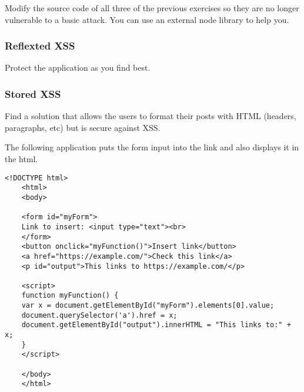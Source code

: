 \begin{Exercise}[label={websec-xss-prevention}]
	Modify the source code of all three of the previous exercises so they are no longer vulnerable to a basic attack. You can use an external node library to help you.
	\subsubsection{Reflexted XSS}
	Protect the application as you find best.
	\subsubsection{Stored XSS}
	Find a solution that allows the users to format their posts with HTML (headers, paragraphs, etc) but is secure against XSS.
\end{Exercise}
\begin{Exercise}[label={websec-xss-breakingcontext}]
	The following application puts the form input into the link and also displays it in the html.
	\begin{lstlisting}[style=JavaScript]
	<!DOCTYPE html>
	<html>
	<body>

	<form id="myForm">
	Link to insert: <input type="text"><br>
	</form> 
	<button onclick="myFunction()">Insert link</button>
	<a href="https://example.com/">Check this link</a>
	<p id="output">This links to https://example.com/</p>
	
	<script>
	function myFunction() {
	var x = document.getElementById("myForm").elements[0].value;
	document.querySelector('a').href = x;
	document.getElementById("output").innerHTML = "This links to:" + x;
	}
	</script>
	
	</body>
	</html>
	
	\end{lstlisting}
\end{Exercise}
